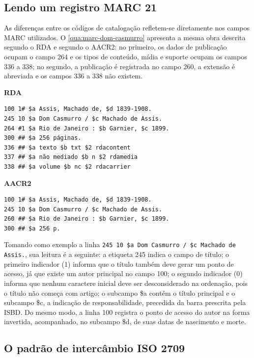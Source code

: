 \subsection{Lendo um registro MARC 21}
\label{subsec:marc-leitura}

As diferenças entre os códigos de catalogação refletem-se diretamente nos campos MARC utilizados. O \autoref{qua:marc-dom-casmurro} apresenta a mesma obra descrita segundo o RDA e segundo o AACR2: no primeiro, os dados de publicação ocupam o campo 264 e os tipos de conteúdo, mídia e suporte ocupam os campos 336 a 338; no segundo, a publicação é registrada no campo 260, a extensão é abreviada e os campos 336 a 338 não existem.

\begin{quadro}[htb]
    \caption{Registro de \textit{Dom Casmurro} em MARC 21 segundo o RDA e o AACR2 (simplificado)}
    \label{qua:marc-dom-casmurro}
    \footnotesize
    \textbf{RDA}
\begin{verbatim}
100 1# $a Assis, Machado de, $d 1839-1908.
245 10 $a Dom Casmurro / $c Machado de Assis.
264 #1 $a Rio de Janeiro : $b Garnier, $c 1899.
300 ## $a 256 páginas.
336 ## $a texto $b txt $2 rdacontent
337 ## $a não mediado $b n $2 rdamedia
338 ## $a volume $b nc $2 rdacarrier
\end{verbatim}
    \textbf{AACR2}
\begin{verbatim}
100 1# $a Assis, Machado de, $d 1839-1908.
245 10 $a Dom Casmurro / $c Machado de Assis.
260 ## $a Rio de Janeiro : $b Garnier, $c 1899.
300 ## $a 256 p.
\end{verbatim}
\end{quadro}

Tomando como exemplo a linha \texttt{245 10 \$a Dom Casmurro / \$c Machado de Assis.}, sua leitura é a seguinte: a etiqueta 245 indica o campo de título; o primeiro indicador (1) informa que o título também deve gerar um ponto de acesso, já que existe um autor principal no campo 100; o segundo indicador (0) informa que nenhum caractere inicial deve ser desconsiderado na ordenação, pois o título não começa com artigo; o subcampo \$a contém o título principal e o subcampo \$c, a indicação de responsabilidade, precedida da barra prescrita pela ISBD. Do mesmo modo, a linha 100 registra o ponto de acesso do autor na forma invertida, acompanhado, no subcampo \$d, de suas datas de nascimento e morte.

\subsection{O padrão de intercâmbio ISO 2709}
\label{subsec:iso2709}

